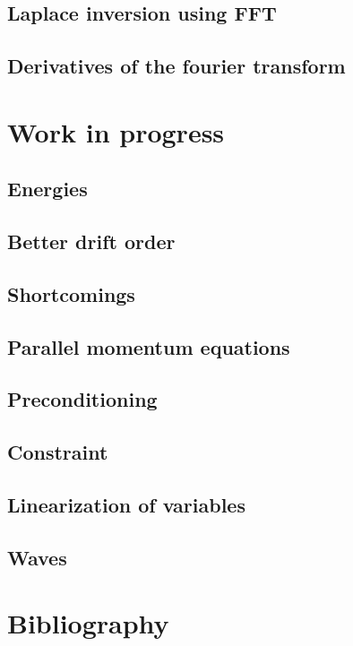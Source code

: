 \documentclass[12pt,a4paper,oneside,openright]{report} %
\begin{document}
\chapter{Laplace inversion using FFT}
\label{app:lapInv}


\chapter{Derivatives of the fourier transform}
\label{app:deriv_of_FT}


\part{Work in progress}

\chapter{Energies}
\label{app:energies}


\chapter{Better drift order}
\label{app:betterDO}


\chapter{Shortcomings}
\label{app:shortcomings}


\chapter{Parallel momentum equations}
\label{app:parMom}



\chapter{Preconditioning}
\label{app:precon}


\chapter{Constraint}


\chapter{Linearization of variables}
\label{app:linearized}


\chapter{Waves}
\label{app:waves}


\part{Bibliography}


\end{document}
